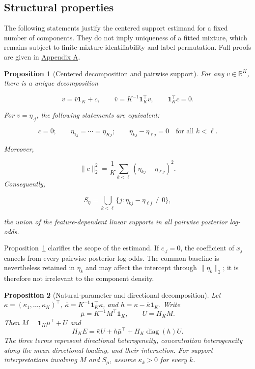 \documentclass[preprint,12pt,authoryear]{elsarticle}
\newtheorem{proposition}{Proposition}
\begin{document}
\subsection{Structural properties}
\label{sec:structural}

The following statements justify the centered support estimand for a fixed
number of components. They do not imply uniqueness of a fitted mixture, which
remains subject to finite-mixture identifiability and label permutation. Full
proofs are given in \hyperref[app:proofs]{Appendix A}.

\begin{proposition}[Centered decomposition and pairwise support]
\label{prop:centered-support}
For any $v\in\mathbb R^K$, there is a unique decomposition

\[
v=\bar v\mathbf1_K+c,
\qquad
\bar v=K^{-1}\mathbf1_K^\top v,
\qquad
\mathbf1_K^\top c=0.
\]

For $v=\eta_{\cdot j}$, the following statements are equivalent:

\[
c=0;
\qquad
\eta_{1j}=\cdots=\eta_{Kj};
\qquad
\eta_{kj}-\eta_{\ell j}=0\quad\text{for all }k<\ell.
\]

Moreover,

\[
\lVert c\rVert_2^2
=\frac1K\sum_{k<\ell}(\eta_{kj}-\eta_{\ell j})^2.
\]
Consequently,

\[
S_{\eta}
=\bigcup_{k<\ell}\{j:\eta_{kj}-\eta_{\ell j}\neq0\},
\]

the union of the feature-dependent linear supports in all pairwise posterior
log-odds.
\end{proposition}

Proposition~\ref{prop:centered-support} clarifies the scope of the estimand. If
$c_{\cdot j}=0$, the coefficient of $x_j$ cancels from every pairwise
posterior log-odds. The common baseline is nevertheless retained in $\eta_k$
and may affect the intercept through $\lVert\eta_k\rVert_2$; it is therefore
not irrelevant to the component density.

\begin{proposition}[Natural-parameter and directional decomposition]
\label{prop:canonical-directional}
Let $\kappa=(\kappa_1,\ldots,\kappa_K)^\top$,
$\bar\kappa=K^{-1}\mathbf1_K^\top\kappa$, and
$h=\kappa-\bar\kappa\mathbf1_K$. Write
\[
\bar\mu=K^{-1}M^\top\mathbf1_K,
\qquad
U=H_KM.
\]
Then $M=\mathbf1_K\bar\mu^\top+U$ and
\[
H_KE
=\bar\kappa U+h\bar\mu^\top+H_K\operatorname{diag}(h)U.
\]
The three terms represent directional heterogeneity, concentration
heterogeneity along the mean directional loading, and their interaction.
For support interpretations involving $M$ and $S_\mu$, assume
$\kappa_k>0$ for every $k$.
\end{proposition}
\end{document}
